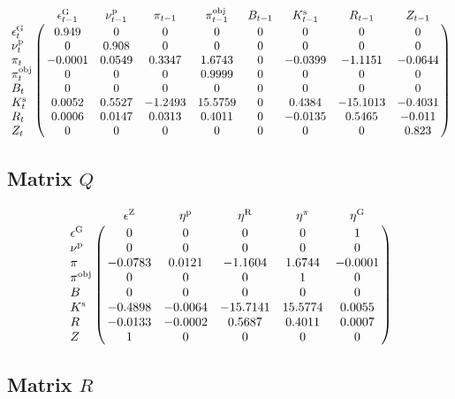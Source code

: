 $$\bordermatrix{
~ & \epsilon^{\mathrm{G}}_{t-1} & \nu^{\mathrm{p}}_{t-1} & \pi_{t-1} & \pi^{\mathrm{obj}}_{t-1} & B_{t-1} & K^{\mathrm{s}}_{t-1} & R_{t-1} & Z_{t-1} \cr
\epsilon^{\mathrm{G}}_{t} & 0.949 & 0 & 0 & 0 & 0 & 0 & 0 & 0 \cr
\nu^{\mathrm{p}}_{t} & 0 & 0.908 & 0 & 0 & 0 & 0 & 0 & 0 \cr
\pi_{t} & -0.0001 & 0.0549 & 0.3347 & 1.6743 & 0 & -0.0399 & -1.1151 & -0.0644 \cr
\pi^{\mathrm{obj}}_{t} & 0 & 0 & 0 & 0.9999 & 0 & 0 & 0 & 0 \cr
B_{t} & 0 & 0 & 0 & 0 & 0 & 0 & 0 & 0 \cr
K^{\mathrm{s}}_{t} & 0.0052 & 0.5527 & -1.2493 & 15.5759 & 0 & 0.4384 & -15.1013 & -0.4031 \cr
R_{t} & 0.0006 & 0.0147 & 0.0313 & 0.4011 & 0 & -0.0135 & 0.5465 & -0.011 \cr
Z_{t} & 0 & 0 & 0 & 0 & 0 & 0 & 0 & 0.823 \cr
}$$

\subsection*{Matrix $Q$}

$$\bordermatrix{
~ & \epsilon^{\mathrm{Z}} & \eta^{\mathrm{p}} & \eta^{\mathrm{R}} & \eta^{\pi} & \eta^{\mathrm{G}} \cr
\epsilon^{\mathrm{G}} & 0 & 0 & 0 & 0 & 1 \cr
\nu^{\mathrm{p}} & 0 & 0 & 0 & 0 & 0 \cr
\pi & -0.0783 & 0.0121 & -1.1604 & 1.6744 & -0.0001 \cr
\pi^{\mathrm{obj}} & 0 & 0 & 0 & 1 & 0 \cr
B & 0 & 0 & 0 & 0 & 0 \cr
K^{\mathrm{s}} & -0.4898 & -0.0064 & -15.7141 & 15.5774 & 0.0055 \cr
R & -0.0133 & -0.0002 & 0.5687 & 0.4011 & 0.0007 \cr
Z & 1 & 0 & 0 & 0 & 0 \cr
}$$

\subsection*{Matrix $R$}

